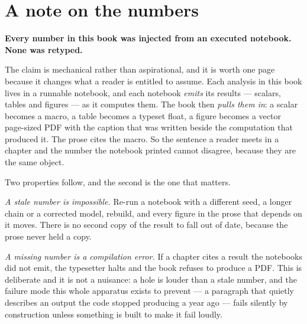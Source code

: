 %
\chapter*{A note on the numbers}

\textbf{Every number in this book was injected from an executed notebook. None was retyped.}

The claim is mechanical rather than aspirational, and it is worth one page because it changes what
a reader is entitled to assume. Each analysis in this book lives in a runnable notebook, and each
notebook \emph{emits} its results --- scalars, tables and figures --- as it computes them. The
book then \emph{pulls them in}: a scalar becomes a macro, a table becomes a typeset
 float, a figure becomes a vector page-sized PDF with the caption that was written
beside the computation that produced it. The prose cites the macro. So the sentence a reader meets
in a chapter and the number the notebook printed cannot disagree, because they are the same
object.

Two properties follow, and the second is the one that matters.

\emph{A stale number is impossible.} Re-run a notebook with a different seed, a longer chain or a
corrected model, rebuild, and every figure in the prose that depends on it moves. There is no
second copy of the result to fall out of date, because the prose never held a copy.

\emph{A missing number is a compilation error.} If a chapter cites a result the notebooks did not
emit, the typesetter halts and the book refuses to produce a PDF. This is deliberate and it is not
a nuisance: a hole is louder than a stale number, and the failure mode this whole apparatus exists
to prevent --- a paragraph that quietly describes an output the code stopped producing a year ago
--- fails silently by construction unless something is built to make it fail loudly.

